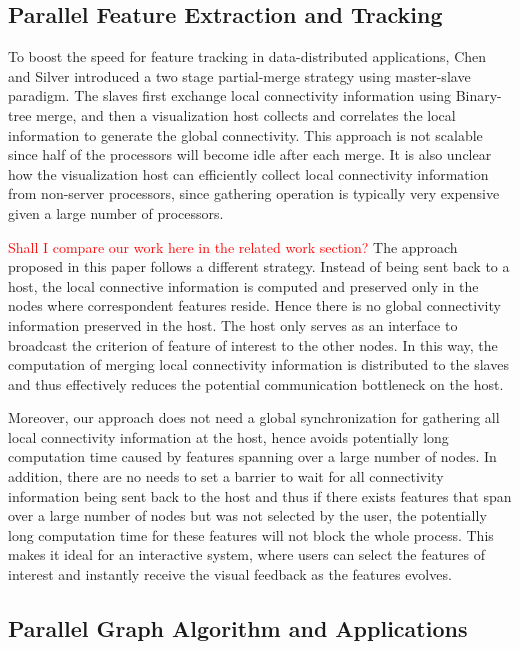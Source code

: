 \documentclass[10pt, conference, compsocconf]{IEEEtran}
\begin{document}
\subsection{Parallel Feature Extraction and Tracking}

To boost the speed for feature tracking in data-distributed applications, Chen and Silver \cite{Chen2003} introduced a two stage partial-merge strategy using master-slave paradigm. The slaves first exchange local connectivity information using Binary-tree merge, and then a visualization host collects and correlates the local information to generate the global connectivity. This approach is not scalable since half of the processors will become idle after each merge. It is also unclear how the visualization host can efficiently collect local connectivity information from non-server processors, since gathering operation is typically very expensive given a large number of processors. 

\textcolor{red}{Shall I compare our work here in the related work section?}
The approach proposed in this paper follows a different strategy. Instead of being sent back to a host, the local connective information is computed and preserved only in the nodes where correspondent features reside. Hence there is no global connectivity information preserved in the host. The host only serves as an interface to broadcast the criterion of feature of interest to the other nodes. In this way, the computation of merging local connectivity information is distributed to the slaves and thus effectively reduces the potential communication bottleneck on the host.

Moreover, our approach does not need a global synchronization for gathering all local connectivity information at the host, hence avoids potentially long computation time caused by features spanning over a large number of nodes. In addition, there are no needs to set a barrier to wait for all connectivity information being sent back to the host and thus if there exists features that span over a large number of nodes but was not selected by the user, the potentially long computation time for these features will not block the whole process. This makes it ideal for an interactive system, where users can select the features of interest and instantly receive the visual feedback as the features evolves.

\subsection{Parallel Graph Algorithm and Applications}
\end{document}
